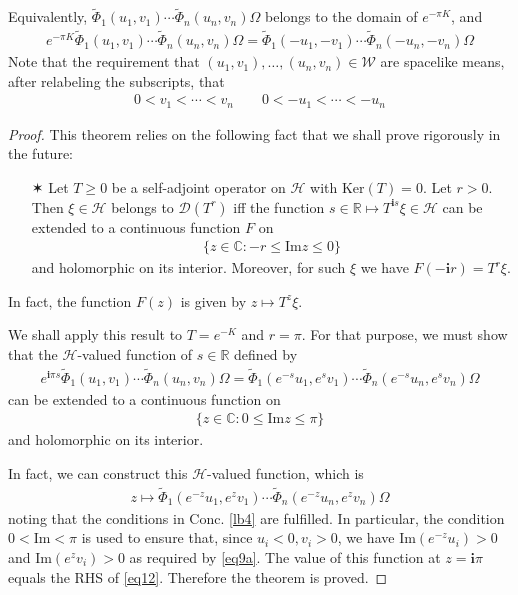 \documentclass[12pt,b5paper,notitlepage]{article}
\theoremstyle{definition}
\theoremstyle{plain}
\newcommand{\mc}{\mathcal}
\newcommand{\wtd}{\widetilde}
\newcommand{\Dom}{\scr{D}}
\newcommand{\scr}{\mathscr}
\newcommand{\im}{\mathbf{i}}
\newcommand{\Cbb}{\mathbb C}
\newcommand{\Rbb}{\mathbb R}
\newcommand{\Ker}{\mathrm{Ker}}
\newcommand{\Imag}{\mathrm{Im}}
\numberwithin{equation}{section}
\begin{document}
Equivalently, $\wtd\Phi_1(u_1,v_1)\cdots\wtd\Phi_n(u_n,v_n)\Omega$ belongs to the domain of $e^{-\pi K}$, and
\begin{align}\label{eq12}
e^{-\pi K}\wtd\Phi_1(u_1,v_1)\cdots\wtd\Phi_n(u_n,v_n)\Omega=\wtd\Phi_1(-u_1,-v_1)\cdots\wtd\Phi_n(-u_n,-v_n)\Omega
\end{align}
Note that the requirement that $(u_1,v_1),\dots,(u_n,v_n)\in\mc W$ are spacelike means, after relabeling the subscripts, that
\begin{align*}
0<v_1<\cdots<v_n\qquad 0<-u_1<\cdots<-u_n
\end{align*}
\begin{proof}
This theorem relies on the following fact that we shall prove rigorously in the future:
\begin{itemize}
\item[$\varstar$] Let $T\geq0$ be a self-adjoint operator on $\mc H$ with $\Ker(T)=0$. Let $r>0$. Then $\xi\in\mc H$ belongs to $\Dom(T^r)$ iff the function $s\in\Rbb\mapsto T^{\im s}\xi\in\mc H$ can be extended to a continuous function $F$ on 
\begin{align*}
\{z\in\Cbb:-r\leq\Imag z\leq0\}
\end{align*}
and holomorphic on its interior. Moreover, for such $\xi$ we have $F(-\im r)=T^r\xi$.
\end{itemize}
In fact, the function $F(z)$ is given by $z\mapsto T^z\xi$.

We shall apply this result to $T=e^{-K}$ and $r=\pi$. For that purpose, we must show that the $\mc H$-valued function of $s\in\Rbb$ defined by
\begin{align*}
e^{\im\pi s}\wtd\Phi_1(u_1,v_1)\cdots\wtd\Phi_n(u_n,v_n)\Omega=\wtd\Phi_1(e^{-s}u_1,e^sv_1)\cdots\wtd\Phi_n(e^{-s}u_n,e^sv_n)\Omega
\end{align*}
can be extended to a continuous function on
\begin{align*}
\{z\in\Cbb:0\leq\Imag z\leq \pi\}
\end{align*}
and holomorphic on its interior. 

In fact, we can construct this $\mc H$-valued function, which is
\begin{align*}
z\mapsto \wtd\Phi_1(e^{-z}u_1,e^zv_1)\cdots\wtd\Phi_n(e^{-z}u_n,e^zv_n)\Omega
\end{align*}
noting that the conditions in Conc. \ref{lb4} are fulfilled. In particular, the condition $0<\Imag<\pi$ is used to ensure that, since $u_i<0,v_i>0$, we have $\Imag (e^{-z}u_i)>0$ and $\Imag(e^zv_i)>0$ as required by \eqref{eq9a}. The value of this function at $z=\im\pi$ equals the RHS of \eqref{eq12}. Therefore the theorem is proved.
\end{proof}
\end{document}
